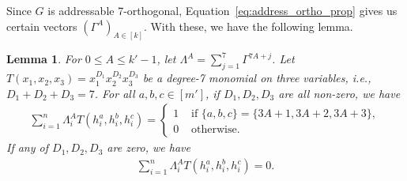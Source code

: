 \documentclass[11pt]{article}
\newtheorem{lemma}[theorem]{Lemma}
\theoremstyle{definition}
\renewcommand{\le}{\leqslant}
\begin{document}
Since $G$ is addressable 7-orthogonal, Equation~\eqref{eq:address_ortho_prop} gives us certain vectors $(\Gamma^A)_{A \in [k]}$. With these, we have the following lemma.
\begin{lemma}\label{lem:extended_orthogonality}
    For $0\le A\le k'-1$, let $\Lambda^A = \sum_{j=1}^7 \Gamma^{7A+j}$. 
    Let $T(x_1, x_2, x_3) = x_1^{D_1}x_2^{D_2}x_3^{D_3}$ be a degree-7 monomial on three variables, i.e., $D_1 + D_2 + D_3 = 7$.
    For all $a, b, c\in [m']$, if $D_1,D_2,D_3$ are all non-zero, 
    we have
    \begin{align}
        \label{eq:intrablock_lem_1}
        \sum_{i=1}^n \Lambda^A_iT(h^{a}_i, h^b_i,h^c_i) = 
        \begin{cases}
            1 &\text{ if } \{a, b, c\} = \{3A+1, 3A+2, 3A + 3\}, \\
            0 &\text{ otherwise.}
        \end{cases}
    \end{align}
    If any of $D_1,D_2,D_3$ are zero, 
    we have
    \begin{align}
    \label{eq:intrablock_lem_2}
        \sum_{i=1}^n \Lambda^A_iT(h^{a}_i, h^b_i,h^c_i) = 0.
    \end{align}
\end{lemma}
\end{document}
